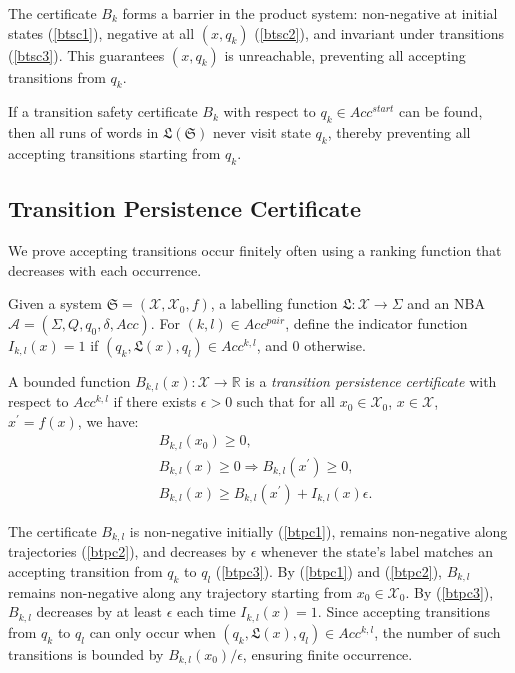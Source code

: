 The certificate $B_k$ forms a barrier in the product system: non-negative at initial states (\ref{btsc1}), negative at all $(x, q_k)$ (\ref{btsc2}), and invariant under transitions (\ref{btsc3}). This guarantees $(x, q_k)$ is unreachable, preventing all accepting transitions from $q_k$.

\begin{lemma}
  \label{transition-safety-lemma}
  If a transition safety certificate $B_k$ with respect to $q_k \in Acc^{start}$ can be found, then all runs of words in $\mathfrak{L}(\mathfrak{S})$ never visit state $q_k$, thereby preventing all accepting transitions starting from $q_k$.
\end{lemma}

\subsection{Transition Persistence Certificate}

We prove accepting transitions occur finitely often using a ranking function that decreases with each occurrence.

\begin{definition}
  \label{transition-persistence-certificate-definition}
  Given a system $\mathfrak{S} = (\mathcal{X}, \mathcal{X}_0, f)$, a labelling function $\mathfrak{L}:\mathcal{X} \rightarrow \Sigma$ and an NBA $\mathcal{A}=(\Sigma, Q, q_0, \delta, Acc)$. For $(k, l) \in Acc^{pair}$, define the indicator function $I_{k,l}(x) = 1$ if $(q_k, \mathfrak{L}(x), q_l) \in Acc^{k,l}$, and $0$ otherwise.

  A bounded function $B_{k, l}(x): \mathcal{X} \rightarrow \mathbb{R}$ is a \emph{transition persistence certificate} with respect to $Acc^{k,l}$ if there exists $\epsilon > 0$ such that for all $x_0 \in \mathcal{X}_0$, $x \in \mathcal{X}$, $x^{\prime} = f(x)$, we have:
  \begin{align}
    &B_{k, l}(x_0) \geq 0, \label{btpc1} \\
    &B_{k, l}(x) \geq 0 \Rightarrow B_{k, l}(x^{\prime}) \geq 0, \label{btpc2} \\
    &B_{k, l}(x) \geq B_{k, l}(x^{\prime}) + I_{k,l}(x)\epsilon. \label{btpc3}
  \end{align}
\end{definition}

The certificate $B_{k,l}$ is non-negative initially (\ref{btpc1}), remains non-negative along trajectories (\ref{btpc2}), and decreases by $\epsilon$ whenever the state's label matches an accepting transition from $q_k$ to $q_l$ (\ref{btpc3}). By (\ref{btpc1}) and (\ref{btpc2}), $B_{k,l}$ remains non-negative along any trajectory starting from $x_0 \in \mathcal{X}_0$. By (\ref{btpc3}), $B_{k,l}$ decreases by at least $\epsilon$ each time $I_{k,l}(x) = 1$. Since accepting transitions from $q_k$ to $q_l$ can only occur when $(q_k, \mathfrak{L}(x), q_l) \in Acc^{k,l}$, the number of such transitions is bounded by $B_{k,l}(x_0)/\epsilon$, ensuring finite occurrence.


